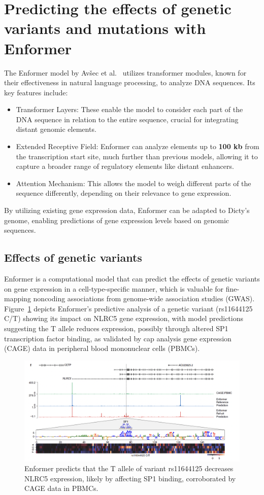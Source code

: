 \documentclass[final,5p,times,twocolumn]{elsarticle}
\begin{document}
\section{Predicting the effects of genetic variants and mutations with Enformer}
The Enformer model by Avšec et al.~\cite{avsec_effective_2021} utilizes transformer modules, known for their effectiveness in natural language processing, to analyze DNA sequences. Its key features include:
\begin{itemize}
    \item Transformer Layers: These enable the model to consider each part of the DNA sequence in relation to the entire sequence, crucial for integrating distant genomic elements.
    \item Extended Receptive Field: Enformer can analyze elements up to \textbf{100 kb} from the transcription start site, much further than previous models, allowing it to capture a broader range of regulatory elements like distant enhancers.
    \item Attention Mechanism: This allows the model to weigh different parts of the sequence differently, depending on their relevance to gene expression.
\end{itemize}
By utilizing existing gene expression data, Enformer can be adapted to Dicty's genome, enabling predictions of gene expression levels based on genomic sequences.

\subsection{Effects of genetic variants}

Enformer is a computational model that can predict the effects of genetic variants on gene expression in a cell-type-specific manner, which is valuable for fine-mapping noncoding associations from genome-wide association studies (GWAS). Figure~\ref{fig:variant} depicts Enformer's predictive analysis of a genetic variant (rs11644125 C/T) showing its impact on NLRC5 gene expression, with model predictions suggesting the T allele reduces expression, possibly through altered SP1 transcription factor binding, as validated by cap analysis gene expression (CAGE) data in peripheral blood mononuclear cells (PBMCs).
\begin{figure}[ht]
\centering
\includegraphics[width=\linewidth]{img/variant.png}
\caption{Enformer predicts that the T allele of variant rs11644125 decreases NLRC5 expression, likely by affecting SP1 binding, corroborated by CAGE data in PBMCs.}\label{fig:variant}
\end{figure}
\end{document}
